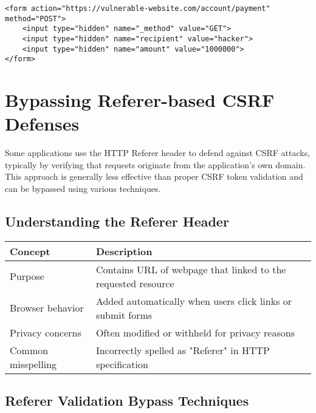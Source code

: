 \documentclass{article}
\begin{document}
\begin{lstlisting}[frame=single]
<form action="https://vulnerable-website.com/account/payment" method="POST">
    <input type="hidden" name="_method" value="GET">
    <input type="hidden" name="recipient" value="hacker">
    <input type="hidden" name="amount" value="1000000">
</form>
\end{lstlisting}







\section*{Bypassing Referer-based CSRF Defenses}

Some applications use the HTTP Referer header to defend against CSRF attacks, typically by verifying that requests originate from the application's own domain. This approach is generally less effective than proper CSRF token validation and can be bypassed using various techniques.

\subsection*{Understanding the Referer Header}
\begin{tabular}{>{\raggedright\arraybackslash}p{}>{\raggedright\arraybackslash}p{}}
    \toprule
    \textbf{Concept} & \textbf{Description} \\
    \midrule
    Purpose & Contains URL of webpage that linked to the requested resource \\
    Browser behavior & Added automatically when users click links or submit forms \\
    Privacy concerns & Often modified or withheld for privacy reasons \\
    Common misspelling & Incorrectly spelled as "Referer" in HTTP specification \\
    \bottomrule
\end{tabular}

\subsection*{Referer Validation Bypass Techniques}
\end{document}

